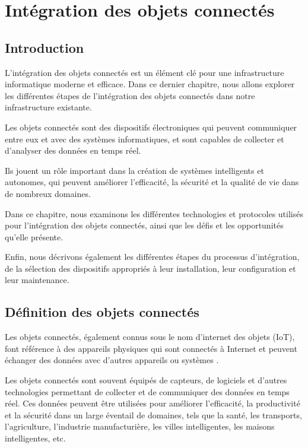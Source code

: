 \chapter{Intégration des objets connectés}

\section{Introduction}

L'intégration des objets connectés est un élément clé pour une infrastructure informatique moderne et efficace. Dans ce dernier chapitre, nous allons explorer les différentes étapes de l'intégration des objets connectés dans notre infrastructure existante. 

Les objets connectés sont des dispositifs électroniques qui peuvent communiquer entre eux et avec des systèmes informatiques, et sont capables de collecter et d'analyser des données en temps réel. 

Ils jouent un rôle important dans la création de systèmes intelligents et autonomes, qui peuvent améliorer l'efficacité, la sécurité et la qualité de vie dans de nombreux domaines. 

Dans ce chapitre, nous examinons les différentes technologies et protocoles utilisés pour l'intégration des objets connectés, ainsi que les défis et les opportunités qu'elle présente. 

Enfin, nous décrivons également les différentes étapes du processus d'intégration, de la sélection des dispositifs appropriés à leur installation, leur configuration et leur maintenance. 



\section{Définition des objets connectés}

Les objets connectés, également connus sous le nom d'internet des objets (IoT), font référence à des appareils physiques qui sont connectés à Internet et peuvent échanger des données avec d'autres appareils ou systèmes \cite{gazis2021iot}.

Les objets connectés sont souvent équipés de capteurs, de logiciels et d'autres technologies permettant de collecter et de communiquer des données en temps réel. Ces données peuvent être utilisées pour améliorer l'efficacité, la productivité et la sécurité dans un large éventail de domaines, tels que la santé, les transports, l'agriculture, l'industrie manufacturière, les villes intelligentes, les maisons intelligentes, etc.

